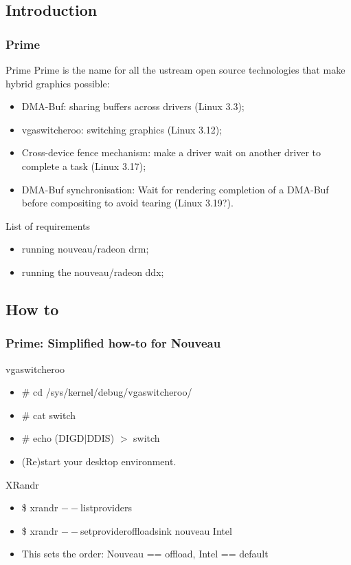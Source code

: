 \documentclass[11pt,english,compress]{beamer}
\begin{document}
\subsection{Introduction}
\begin{frame}
	\frametitle{Prime}

	\begin{block}{Prime}
		Prime is the name for all the ustream open source technologies
		that make hybrid graphics possible:
		\begin{itemize}
			\item DMA-Buf: sharing buffers across drivers (Linux 3.3);
			\item vgaswitcheroo: switching graphics (Linux 3.12);
			\item Cross-device fence mechanism: make a driver wait on another driver to complete a task (Linux 3.17);
			\item DMA-Buf synchronisation: Wait for rendering completion of a DMA-Buf before compositing to avoid tearing (Linux 3.19?).
		\end{itemize}
	\end{block}

	\begin{block}{List of requirements}
		\begin{itemize}
			\item running nouveau/radeon drm;
			\item running the nouveau/radeon ddx;
		\end{itemize}
	\end{block}
\end{frame}

\subsection{How to}
\begin{frame}
	\frametitle{Prime: Simplified how-to for Nouveau}

	\begin{block}{vgaswitcheroo}
		\begin{itemize}
			\item \# cd /sys/kernel/debug/vgaswitcheroo/
			\item \# cat switch
			\item \# echo (DIGD$|$DDIS) $>$ switch
			\item (Re)start your desktop environment.
		\end{itemize}
	\end{block}

	\begin{block}{XRandr}
		\begin{itemize}
			\item \$ xrandr $--$listproviders
			\item \$ xrandr $--$setprovideroffloadsink nouveau Intel
			\item This sets the order: Nouveau == offload, Intel == default
		\end{itemize}
	\end{block}
\end{frame}
\end{document}

